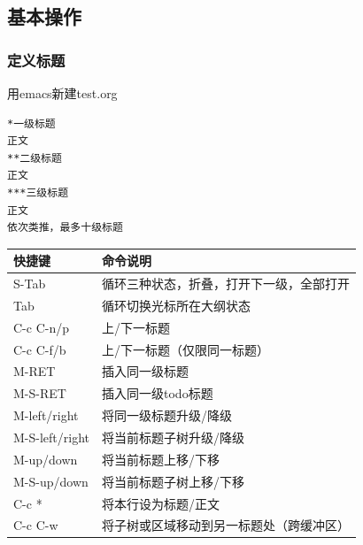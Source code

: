 \documentclass[11pt]{article}
\begin{document}
\subsection{基本操作}
\label{sec-6-2}
\subsubsection{定义标题}
\label{sec-6-2-1}

    用emacs新建test.org

\begin{verbatim}
*一级标题
正文
**二级标题
正文
***三级标题
正文
依次类推，最多十级标题
\end{verbatim}


\begin{center}
\begin{tabular}{ll}
 快捷键          &  命令说明                                  \\
\hline
 S-Tab           &  循环三种状态，折叠，打开下一级，全部打开  \\
 Tab             &  循环切换光标所在大纲状态                  \\
 C-c C-n/p       &  上/下一标题                               \\
 C-c C-f/b       &  上/下一标题（仅限同一标题）               \\
 M-RET           &  插入同一级标题                            \\
 M-S-RET         &  插入同一级todo标题                        \\
 M-left/right    &  将同一级标题升级/降级                     \\
 M-S-left/right  &  将当前标题子树升级/降级                   \\
 M-up/down       &  将当前标题上移/下移                       \\
 M-S-up/down     &  将当前标题子树上移/下移                   \\
 C-c *           &  将本行设为标题/正文                       \\
 C-c C-w         &  将子树或区域移动到另一标题处（跨缓冲区）  \\
\end{tabular}
\end{center}


    
\end{document}
